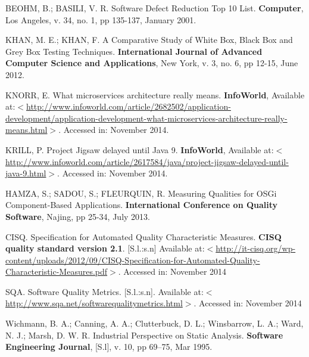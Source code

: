 \documentclass[cic,dipl,english]{iiufrgs} %
\begin{document}
%
\begin{thebibliography}{este-parametro-nao-eh-usado-pelo-estilo-ABNT}

 


 BEOHM, B.; BASILI, V. R.
  Software Defect Reduction Top 10 List. \textbf{Computer}, Los Angeles, v. 34, no. 1, pp 135-137, January 2001. 

 KHAN, M. E.; KHAN, F.
 A Comparative Study of White Box, Black Box and Grey Box Testing Techniques. \textbf{International Journal of Advanced Computer Science and Applications}, New York, v. 3, no. 6, pp 12-15, June 2012.

 KNORR, E.
What microservices architecture really means. \textbf{InfoWorld}, Available at:$<$\url{http://www.infoworld.com/article/2682502/application-development/application-development-what-microservices-architecture-really-means.html}$>$. Accessed in: November 2014. 


 KRILL, P.
Project Jigsaw delayed until Java 9. \textbf{InfoWorld}, Available at:$<$\url{http://www.infoworld.com/article/2617584/java/project-jigsaw-delayed-until-java-9.html}$>$. Accessed in: November 2014. 

 HAMZA, S.; SADOU, S.; FLEURQUIN, R.
 Measuring Qualities for OSGi Component-Based Applications. \textbf{International Conference on Quality Software}, Najing, pp 25-34, July 2013.

 CISQ.
 Specification for Automated Quality Characteristic Measures. \textbf{CISQ quality standard version 2.1}. [S.l.:s.n] Available at:$<$\url{http://it-cisq.org/wp-content/uploads/2012/09/CISQ-Specification-for-Automated-Quality-Characteristic-Measures.pdf}$>$. Accessed in: November 2014

 SQA.
Software Quality Metrics. [S.l.:s.n]. Available at:$<$\url{http://www.sqa.net/softwarequalitymetrics.html}$>$. Accessed in: November 2014 

Wichmann, B. A.; Canning, A. A.; Clutterbuck, D. L.; Winsbarrow, L. A.; Ward, N. J.; Marsh, D. W. R.
Industrial Perspective on Static Analysis. \textbf{Software Engineering Journal}, [S.l], v. 10, pp 69–75, Mar 1995.


\end{thebibliography}
\end{document}
